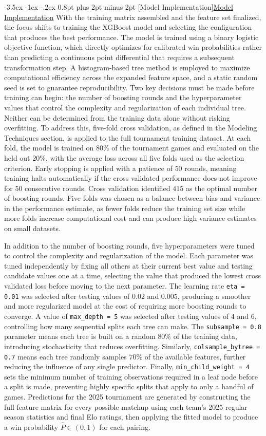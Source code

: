 \documentclass[12pt,leqno]{article}\usepackage[pdftex]{graphicx}\usepackage[dvipsnames]{xcolor}
\makeatletter
\renewcommand\subsubsection{\@startsection {subsubsection}{1}{\z@}%
{-3.5ex \@plus -1ex \@minus -.2ex}%
{0.8pt plus 2pt minus 2pt}%
{\normalfont}}
\newcommand{\usubsubsection}[1]{\subsubsection[#1]{\normalfont\normalfont\underline{#1}}}%
\theoremstyle{remark}
\makeatother
\begin{document}
\usubsubsection{Model Implementation}
With the training matrix assembled and the feature set finalized, the focus shifts to training the XGBoost model and selecting the configuration that produces the best performance. The model is trained using a binary logistic objective function, which directly optimizes for calibrated win probabilities rather than predicting a continuous point differential that requires a subsequent transformation step. A histogram-based tree method is employed to maximize computational efficiency across the expanded feature space, and a static random seed is set to guarantee reproducibility. Two key decisions must be made before training can begin: the number of boosting rounds and the hyperparameter values that control the complexity and regularization of each individual tree. Neither can be determined from the training data alone without risking overfitting. To address this, five-fold cross validation, as defined in the Modeling Techniques section, is applied to the full tournament training dataset. At each fold, the model is trained on $80\%$ of the tournament games and evaluated on the held out $20\%$, with the average loss across all five folds used as the selection criterion. Early stopping is applied with a patience of $50$ rounds, meaning training halts automatically if the cross validated performance does not improve for $50$ consecutive rounds. Cross validation identified $415$ as the optimal number of boosting rounds. Five folds was chosen as a balance between bias and variance in the performance estimate, as fewer folds reduce the training set size while more folds increase computational cost and can produce high variance estimates on small datasets.

In addition to the number of boosting rounds, five hyperparameters were tuned to control the complexity and regularization of the model. Each parameter was tuned independently by fixing all others at their current best value and testing candidate values one at a time, selecting the value that produced the lowest cross validated loss before moving to the next parameter. The learning rate \texttt{eta = 0.01} was selected after testing values of $0.02$ and $0.005$, producing a smoother and more regularized model at the cost of requiring more boosting rounds to converge. A value of \texttt{max\_depth = 5} was selected after testing values of $4$ and $6$, controlling how many sequential splits each tree can make. The \texttt{subsample = 0.8} parameter means each tree is built on a random $80\%$ of the training data, introducing stochasticity that reduces overfitting. Similarly, \texttt{colsample\_bytree = 0.7} means each tree randomly samples $70\%$ of the available features, further reducing the influence of any single predictor. Finally, \texttt{min\_child\_weight = 4} sets the minimum number of training observations required in a leaf node before a split is made, preventing highly specific splits that apply to only a handful of games. Predictions for the 2025 tournament are generated by constructing the full feature matrix for every possible matchup using each team's 2025 regular season statistics and final Elo ratings, then applying the fitted model to produce a win probability $\hat{P} \in (0,1)$ for each pairing.
\end{document}
